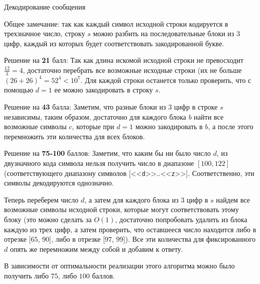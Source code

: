 \begin{tutorial}{Декодирование сообщения}

Общее замечание: так как каждый символ исходной строки кодируется в трехзначное число, строку $s$ можно разбить на последовательные блоки из $3$ цифр, каждый из которых будет соответствовать закодированной букве.

Решение на \textbf{21} балл: Так как длина искомой исходной строки не превосходит $\frac{12}{3} = 4$, достаточно перебрать все возможные исходные строки (их не больше $(26 + 26)^4 = 52^4 < 10^7$. Для каждой строки останется только проверить, что с помощью $d = 1$ ее можно закодировать в строку $s$.

Решение на \textbf{43} балла: Заметим, что разные блоки из $3$ цифр в строке $s$ независимы, таким образом, достаточно для каждого блока $b$ найти все возможные символы $c$, которые при $d = 1$ можно закодировать в $b$, а после этого перемножить эти количества для всех блоков.

Решение на \textbf{75-100} баллов: Заметим, что каким бы ни было число $d$, из двузначного кода символа нельзя получить число в диапазоне $[100, 122]$ (соответствующего диапазону символов [<<\texttt{d}>>..<<\texttt{z}>>]. Соответственно, эти символы декодируются однозначно.

Теперь переберем число $d$, а затем для каждого блока из $3$ цифр в $s$ найдем все возможные символы исходной строки, которые могут соответствовать этому блоку (это можно сделать за $O(1)$, достаточно попробовать удалить из блока каждую из трех цифр, а затем проверить, что оставшееся число находится либо в отрезке [$65$, $90$], либо в отрезке [$97$, $99$]). Все эти количества для фиксированного $d$ опять же перемножим между собой и добавим к ответу.

В зависимости от оптимальности реализации этого алгоритма можно было получить либо $75$, либо $100$ баллов.


\end{tutorial}
